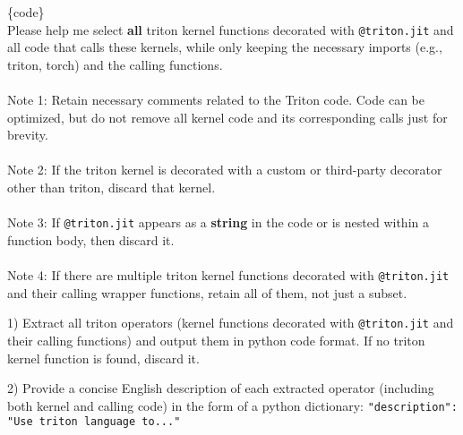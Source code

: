 
\begin{tcolorbox}[colframe=gray!80!black, colback=gray!10!white, title=Filtering Prompt]
\small
{\{code\}}\\
\justifying
Please help me select \textbf{all} triton kernel functions decorated with \texttt{@triton.jit} and all code that calls these kernels, while only keeping the necessary imports (e.g., triton, torch) and the calling functions. \\
\hdashrule[0.5ex]{15cm}{0.1pt}{1mm}
\justifying \\
Note 1: Retain necessary comments related to the Triton code. Code can be optimized, but do not remove all kernel code and its corresponding calls just for brevity. \\
\hdashrule[0.5ex]{15cm}{0.1pt}{1mm}
\justifying \\
Note 2: If the triton kernel is decorated with a custom or third-party decorator other than triton, discard that kernel. \\
\hdashrule[0.5ex]{15cm}{0.1pt}{1mm}
\justifying \\
Note 3: If \texttt{@triton.jit} appears as a \textbf{string} in the code or is nested within a function body, then discard it. \\
\hdashrule[0.5ex]{15cm}{0.1pt}{1mm}
\justifying \\
Note 4: If there are multiple triton kernel functions decorated with \texttt{@triton.jit} and their calling wrapper functions, retain all of them, not just a subset.

1) Extract all triton operators (kernel functions decorated with \texttt{@triton.jit} and their calling functions) and output them in python code format. If no triton kernel function is found, discard it.

2) Provide a concise English description of each extracted operator (including both kernel and calling code) in the form of a python dictionary: \texttt{"description": "Use triton language to..."}
\label{prompt_filter}
\end{tcolorbox}

